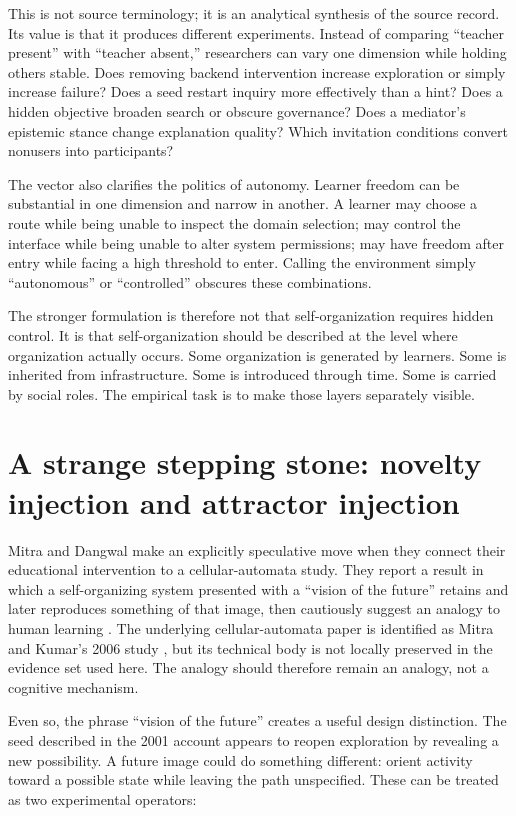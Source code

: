 \documentclass[11pt]{article}
\begin{document}
This is not source terminology; it is an analytical synthesis of the source record. Its value is that it produces different experiments. Instead of comparing ``teacher present'' with ``teacher absent,'' researchers can vary one dimension while holding others stable. Does removing backend intervention increase exploration or simply increase failure? Does a seed restart inquiry more effectively than a hint? Does a hidden objective broaden search or obscure governance? Does a mediator's epistemic stance change explanation quality? Which invitation conditions convert nonusers into participants?

The vector also clarifies the politics of autonomy. Learner freedom can be substantial in one dimension and narrow in another. A learner may choose a route while being unable to inspect the domain selection; may control the interface while being unable to alter system permissions; may have freedom after entry while facing a high threshold to enter. Calling the environment simply ``autonomous'' or ``controlled'' obscures these combinations.

The stronger formulation is therefore not that self-organization requires hidden control. It is that self-organization should be described at the level where organization actually occurs. Some organization is generated by learners. Some is inherited from infrastructure. Some is introduced through time. Some is carried by social roles. The empirical task is to make those layers separately visible.

\section{A strange stepping stone: novelty injection and attractor injection}
Mitra and Dangwal make an explicitly speculative move when they connect their educational intervention to a cellular-automata study. They report a result in which a self-organizing system presented with a ``vision of the future'' retains and later reproduces something of that image, then cautiously suggest an analogy to human learning \citep{mitra2010limits}. The underlying cellular-automata paper is identified as Mitra and Kumar's 2006 study \citep{mitra2006fractal}, but its technical body is not locally preserved in the evidence set used here. The analogy should therefore remain an analogy, not a cognitive mechanism.

Even so, the phrase ``vision of the future'' creates a useful design distinction. The seed described in the 2001 account appears to reopen exploration by revealing a new possibility. A future image could do something different: orient activity toward a possible state while leaving the path unspecified. These can be treated as two experimental operators:
\end{document}
